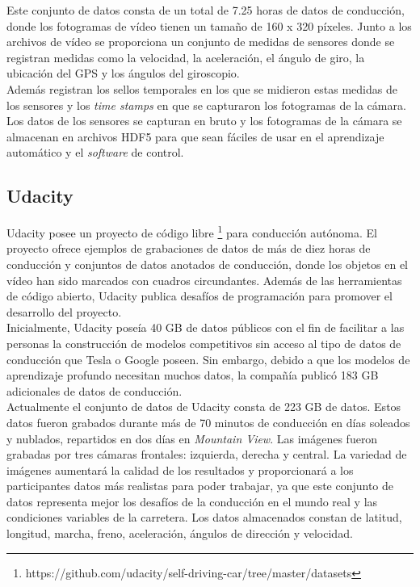 Este conjunto de datos consta de un total de 7.25 horas de datos de conducción, donde los fotogramas de vídeo tienen un tamaño de 160 x 320 píxeles. Junto a los archivos de vídeo se proporciona un conjunto de medidas de sensores donde se registran medidas como la velocidad, la aceleración, el ángulo de giro, la ubicación del GPS y los ángulos del giroscopio.\\

Además registran los sellos temporales en los que se midieron estas medidas de los sensores y los \textit{time  stamps} en que se capturaron los fotogramas de la cámara. Los datos de los sensores se capturan en bruto y los fotogramas de la cámara se almacenan en archivos HDF5 para que sean fáciles de usar en el aprendizaje automático y el \textit{software} de control.

\subsection{Udacity}

Udacity posee un proyecto de código libre \footnote{https://github.com/udacity/self-driving-car/tree/master/datasets} para conducción autónoma. El proyecto ofrece ejemplos de grabaciones de datos de más de diez horas de conducción y conjuntos de datos anotados de conducción, donde los objetos en el vídeo han sido marcados con cuadros circundantes. Además de las herramientas de código abierto, Udacity publica desafíos de programación para promover el desarrollo del proyecto. \\

Inicialmente, Udacity \cite{udacity-data} poseía 40 GB de datos públicos con el fin de facilitar a las personas la construcción de modelos competitivos sin acceso al tipo de datos de conducción que Tesla o Google poseen. Sin embargo, debido a que los modelos de aprendizaje profundo necesitan muchos datos, la compañía publicó 183 GB adicionales de datos de conducción.\\

Actualmente el conjunto de datos de Udacity \cite{udacity-dataset} consta de 223 GB de datos. Estos datos fueron grabados durante más de 70 minutos de conducción en días soleados y nublados, repartidos en dos días en \textit{Mountain View}. Las imágenes fueron grabadas por tres cámaras frontales: izquierda, derecha y central. La variedad de imágenes aumentará la calidad de los resultados y proporcionará a los participantes datos más realistas para poder trabajar, ya que este conjunto de datos representa mejor los desafíos de la conducción en el mundo real y las condiciones variables de la carretera. Los datos almacenados constan de latitud, longitud, marcha, freno, aceleración, ángulos de dirección y velocidad.


